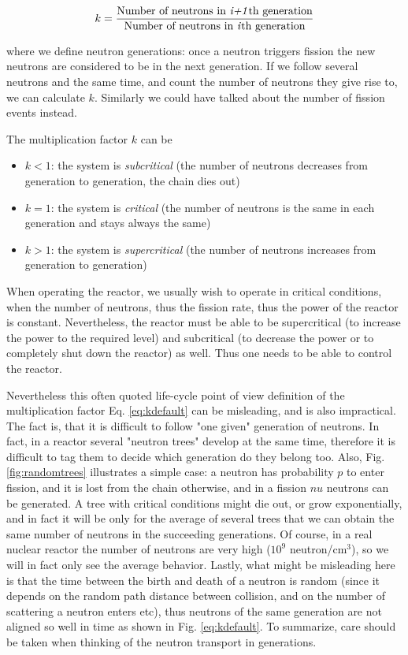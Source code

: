 \begin{equation}\label{eq:kdefault}
k=\frac{\text{Number of neutrons in \textit{i+1}th generation}}{\text{Number of neutrons in \textit{i}th generation}}
\end{equation}

where we define neutron generations: once a neutron triggers fission the new neutrons are considered to be in the next generation. If we follow several neutrons and the same time, and count the number of neutrons they give rise to, we can calculate $k$. Similarly we could have talked about the number of fission events instead. 

The multiplication factor $k$ can be

\begin{itemize}
\item $k<1$: the system is \textit{subcritical} (the number of neutrons decreases from generation to generation, the chain dies out)
\item $k=1$: the system is \textit{critical} (the number of neutrons is the same in each generation and stays always the same)
\item $k>1$: the system is \textit{supercritical} (the number of neutrons increases from generation to generation)
\end{itemize}

When operating the reactor, we usually wish to operate in critical conditions, when the number of neutrons, thus the fission rate, thus the power of the reactor is constant. Nevertheless, the reactor must be able to be supercritical (to increase the power to the required level) and subcritical (to decrease the power or to completely shut down the reactor) as well. Thus one needs to be able to control the reactor.

Nevertheless this often quoted life-cycle point of view definition of the multiplication factor Eq. \ref{eq:kdefault} can be misleading, and is also impractical. The fact is, that it is difficult to follow "one given" generation of neutrons. In fact, in a reactor several "neutron trees" develop at the same time, therefore it is difficult to tag them to decide which generation do they belong too. Also, Fig. \ref{fig:randomtrees} illustrates a simple case: a neutron has probability $p$ to enter fission, and it is lost from the chain otherwise, and in a fission $nu$ neutrons can be generated. A tree with critical conditions might die out, or grow exponentially, and in fact it will be only for the average of several trees that we can obtain the same number of neutrons in the succeeding generations. Of course, in a real nuclear reactor the number of neutrons are very high ($10^9$ neutron/cm$^3$), so we will in fact only see the average behavior. Lastly, what might be misleading here is that the time between the birth and death of a neutron is random (since it depends on the random path distance between collision, and on the number of scattering a neutron enters etc), thus neutrons of the same generation are not aligned so well in time as shown in Fig. \ref{eq:kdefault}. To summarize, care should be taken when thinking of the neutron transport in generations. 

